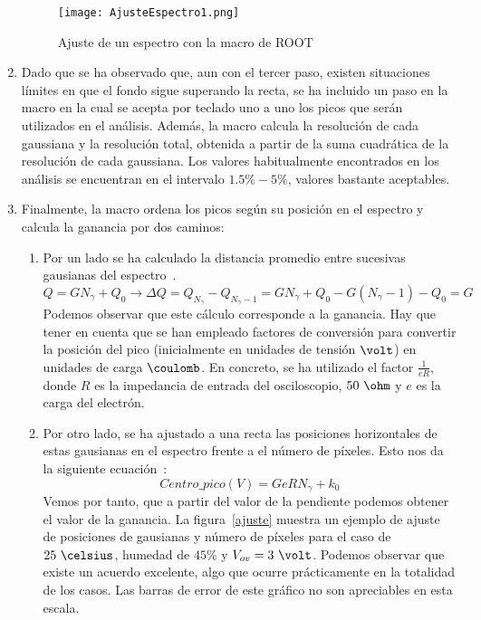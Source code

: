 \begin{enumerate}
\begin{figure}[hbtp]
\centering
\texttt{[image: AjusteEspectro1.png]}
\caption{ Ajuste de un espectro con la macro de ROOT\label{Root}}
\end{figure}

\item {} Dado que se ha observado que, aun con el tercer paso, existen situaciones límites en que el fondo sigue superando la recta, se ha incluido un paso en la macro en la cual se acepta por teclado uno a uno los picos que serán utilizados en el análisis. Además, la macro calcula la resolución de cada gaussiana y la resolución total, obtenida a partir de la suma cuadrática de la resolución de cada gaussiana. Los valores habitualmente encontrados en los análisis se encuentran en el intervalo $1.5\% - 5\%$, valores bastante aceptables.

\item {} Finalmente, la macro ordena los picos según su posición en el espectro y calcula la ganancia por dos caminos:
	\begin{enumerate}

	\item {} Por un lado se ha calculado la distancia promedio entre sucesivas gausianas del espectro~\cite{Hueso}.
	\begin{equation} 
	Q = G N_\gamma + Q_0 \longrightarrow \Delta Q= Q_{N_\gamma} - Q_{N_\gamma -1}=G N_\gamma+ Q_0 - G(N_		\gamma -1) - Q_0 = G
	\label{gananciametodo1}
	\end{equation}
	Podemos observar que este cálculo corresponde a la ganancia. Hay que tener en cuenta que se han empleado factores de conversión para convertir la posición del pico (inicialmente en unidades de	tensión $\volt$) en unidades de carga $\coulomb$. En concreto, se ha utilizado el factor $\frac{1}{eR}$, donde $R$ es la impedancia de entrada del osciloscopio, $50~\ohm$ y $e$ es la carga del electrón.
	
	\item {} Por otro lado, se ha ajustado a una recta las posiciones horizontales de estas gausianas en el 	espectro frente a el número de píxeles. Esto nos da la siguiente ecuación~\cite{Hueso}:
	\begin{equation}
	Centro\_pico(V) = GeRN_\gamma + k_0
	\label{gananciametodo2}
	\end{equation}
	 Vemos por tanto, que a partir del valor de la pendiente podemos obtener	el valor de la ganancia. La figura~\ref{ajuste} muestra un ejemplo de ajuste de posiciones de gausianas y número de píxeles para el caso de $25~\celsius$, humedad de $45\%$ y $V_{ov}=3~\volt$. Podemos observar que existe	un acuerdo excelente, algo que ocurre prácticamente en la totalidad de los casos. Las barras de error  de este gráfico  no son apreciables en esta  escala.
		

\end{enumerate}
\end{enumerate}
